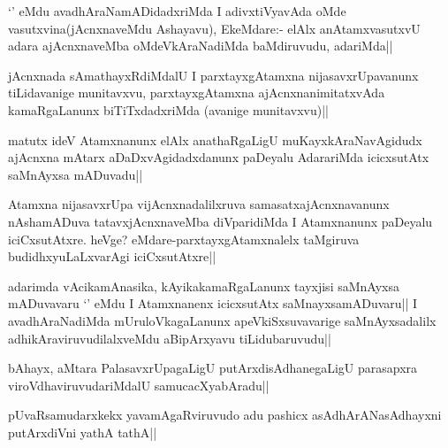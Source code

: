 \begin{artha}
`\stext' eMdu avadhAraNamADidadxriMda I adivxtiVyavAda oMde vasutxvina(jAcnxnaveMdu Ashayavu), EkeMdare:- elAlx anAtamxvasutxvU adara ajAcnxnaveMba oMdeVkAraNadiMda baMdiruvudu, adariMda||
\end{artha}

\begin{artha}
jAcnxnada sAmathayxRdiMdalU I parxtayxgAtamxna nijasavxrUpavanunx tiLidavanige munitavxvu, parxtayxgAtamxna ajAcnxnanimitatxvAda kamaRgaLanunx biTiTxdadxriMda (avanige munitavxvu)||
\end{artha}


\begin{artha}
matutx ideV Atamxnanunx elAlx anathaRgaLigU muKayxkAraNavAgidudx ajAcnxna mAtarx aDaDxvAgidadxdanunx paDeyalu AdarariMda icicxsutAtx saMnAyxsa mADuvadu||
\end{artha}


\begin{artha}
Atamxna nijasavxrUpa vijAcnxnadalilxruva samasatxajAcnxnavanunx nAshamADuva tatavxjAcnxnaveMba diVparidiMda I Atamxnanunx paDeyalu iciCxsutAtxre. heVge? eMdare-parxtayxgAtamxnalelx taMgiruva budidhxyuLaLxvarAgi iciCxsutAtxre||
\end{artha}

\begin{artha}
adarimda vAcikamAnasika, kAyikakamaRgaLanunx tayxjisi saMnAyxsa mADuvavaru `\stext' eMdu I Atamxnanenx icicxsutAtx saMnayxsamADuvaru|| I avadhAraNadiMda mUruloVkagaLanunx apeVkiSxsuvavarige saMnAyxsadalilx adhikAraviruvudilalxveMdu aBipArxyavu tiLidubaruvudu||
\end{artha}


\begin{artha}
bAhayx, aMtara PalasavxrUpagaLigU putArxdisAdhanegaLigU parasapxra viroVdhaviruvudariMdalU samucacXyabAradu||
\end{artha}


\begin{artha}
pUvaRsamudarxkekx yavamAgaRviruvudo adu pashicx asAdhArANasAdhayxni putArxdiVni yathA 
tathA||
\end{artha}

